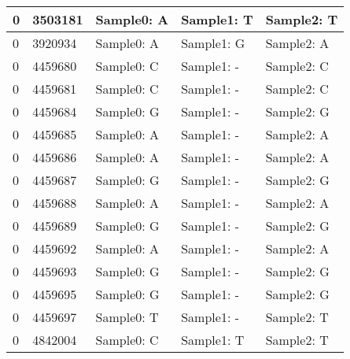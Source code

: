 \begin{longtable}{|l|l|l|l|l|}
	\hline
	0                              & 3503181              & Sample0: A                  & Sample1: T           & Sample2: T            \\ 
	\hline
	0                              & 3920934              & Sample0: A                  & Sample1: G           & Sample2: A            \\ 
	\hline
	0                              & 4459680              & Sample0: C                  & Sample1: -           & Sample2: C            \\ 
	\hline
	0                              & 4459681              & Sample0: C                  & Sample1: -           & Sample2: C            \\ 
	\hline
	0                              & 4459684              & Sample0: G                  & Sample1: -           & Sample2: G            \\ 
	\hline
	0                              & 4459685              & Sample0: A                  & Sample1: -           & Sample2: A            \\ 
	\hline
	0                              & 4459686              & Sample0: A                  & Sample1: -           & Sample2: A            \\ 
	\hline
	0                              & 4459687              & Sample0: G                  & Sample1: -           & Sample2: G            \\ 
	\hline
	0                              & 4459688              & Sample0: A                  & Sample1: -           & Sample2: A            \\ 
	\hline
	0                              & 4459689              & Sample0: G                  & Sample1: -           & Sample2: G            \\ 
	\hline
	0                              & 4459692              & Sample0: A                  & Sample1: -           & Sample2: A            \\ 
	\hline
	0                              & 4459693              & Sample0: G                  & Sample1: -           & Sample2: G            \\ 
	\hline
	0                              & 4459695              & Sample0: G                  & Sample1: -           & Sample2: G            \\ 
	\hline
	0                              & 4459697              & Sample0: T                  & Sample1: -           & Sample2: T            \\ 
	\hline
	0                              & 4842004              & Sample0: C                  & Sample1: T           & Sample2: T            \\ 

\end{longtable}
